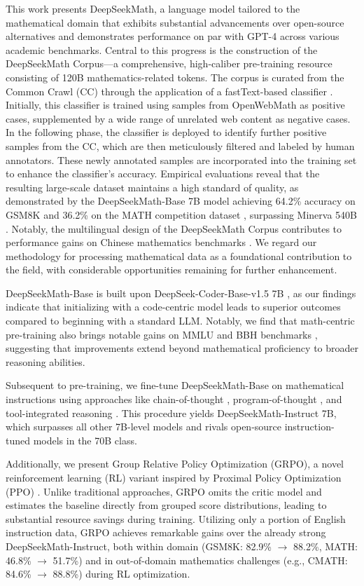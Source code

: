 This work presents DeepSeekMath, a language model tailored to the mathematical domain that exhibits substantial advancements over open-source alternatives and demonstrates performance on par with GPT-4 across various academic benchmarks. Central to this progress is the construction of the DeepSeekMath Corpus—a comprehensive, high-caliber pre-training resource consisting of 120B mathematics-related tokens. The corpus is curated from the Common Crawl (CC) through the application of a fastText-based classifier \citep{joulin2016fasttext}. Initially, this classifier is trained using samples from OpenWebMath \citep{openwebmath} as positive cases, supplemented by a wide range of unrelated web content as negative cases. In the following phase, the classifier is deployed to identify further positive samples from the CC, which are then meticulously filtered and labeled by human annotators. These newly annotated samples are incorporated into the training set to enhance the classifier’s accuracy. Empirical evaluations reveal that the resulting large-scale dataset maintains a high standard of quality, as demonstrated by the DeepSeekMath-Base 7B model achieving 64.2\% accuracy on GSM8K \citep{gsm8k} and 36.2\% on the MATH competition dataset \citep{MATH}, surpassing Minerva 540B \citep{minerva}. Notably, the multilingual design of the DeepSeekMath Corpus contributes to performance gains on Chinese mathematics benchmarks \citep{wei2023cmath,agieval}. We regard our methodology for processing mathematical data as a foundational contribution to the field, with considerable opportunities remaining for further enhancement.

DeepSeekMath-Base is built upon DeepSeek-Coder-Base-v1.5 7B \citep{deepseek-coder}, as our findings indicate that initializing with a code-centric model leads to superior outcomes compared to beginning with a standard LLM. Notably, we find that math-centric pre-training also brings notable gains on MMLU \citep{mmlu} and BBH benchmarks \citep{bbh}, suggesting that improvements extend beyond mathematical proficiency to broader reasoning abilities.

Subsequent to pre-training, we fine-tune DeepSeekMath-Base on mathematical instructions using approaches like chain-of-thought \citep{cot}, program-of-thought \citep{pot,pal}, and tool-integrated reasoning \citep{tora}. This procedure yields DeepSeekMath-Instruct 7B, which surpasses all other 7B-level models and rivals open-source instruction-tuned models in the 70B class.

Additionally, we present Group Relative Policy Optimization (GRPO), a novel reinforcement learning (RL) variant inspired by Proximal Policy Optimization (PPO) \citep{schulman2017proximal}. Unlike traditional approaches, GRPO omits the critic model and estimates the baseline directly from grouped score distributions, leading to substantial resource savings during training. Utilizing only a portion of English instruction data, GRPO achieves remarkable gains over the already strong DeepSeekMath-Instruct, both within domain (GSM8K: 82.9\% $\rightarrow$ 88.2\%, MATH: 46.8\% $\rightarrow$ 51.7\%) and in out-of-domain mathematics challenges (e.g., CMATH: 84.6\% $\rightarrow$ 88.8\%) during RL optimization. 

